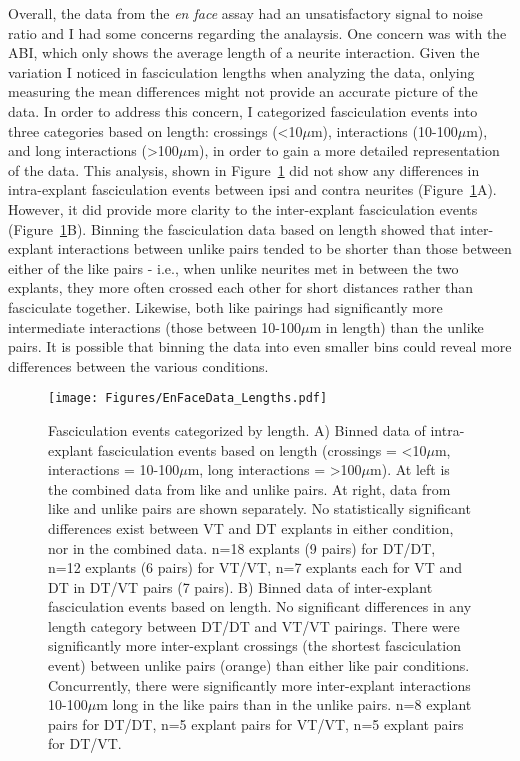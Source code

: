 Overall, the data from the \emph{en face} assay had an unsatisfactory signal to noise ratio and I had some concerns regarding the analaysis.
One concern was with the ABI, which only shows the average length of a neurite interaction.
Given the variation I noticed in fasciculation lengths when analyzing the data, onlying measuring the mean differences might not provide an accurate picture of the data.
In order to address this concern, I categorized fasciculation events into three categories based on length: crossings (<10$\mu$m), interactions (10-100$\mu$m), and long interactions (>100$\mu$m), in order to gain a more detailed representation of the data.
This analysis, shown in Figure~\ref{Figures/EnFaceDataLengths} did not show any differences in intra-explant fasciculation events between ipsi and contra neurites (Figure~\ref{Figures/EnFaceDataLengths}A).
However, it did provide more clarity to the inter-explant fasciculation events (Figure~\ref{Figures/EnFaceDataLengths}B).
Binning the fasciculation data based on length showed that inter-explant interactions between unlike pairs tended to be shorter than those between either of the like pairs - i.e., when unlike neurites met in between the two explants, they more often crossed each other for short distances rather than fasciculate together.
Likewise, both like pairings had significantly more intermediate interactions (those between 10-100$\mu$m in length) than the unlike pairs.
It is possible that binning the data into even smaller bins could reveal more differences between the various conditions.
\begin{figure}[hbtp]
    \begin{center}
        \texttt{[image: Figures/EnFaceData\_Lengths.pdf]}
        \caption[Fasciculation events categorized by length.]
        {Fasciculation events categorized by length.
        A) Binned data of intra-explant fasciculation events based on length (crossings = <10$\mu$m, interactions = 10-100$\mu$m, long interactions = >100$\mu$m).
        At left is the combined data from like and unlike pairs.
        At right, data from like and unlike pairs are shown separately.
        No statistically significant differences exist between VT and DT explants in either condition, nor in the combined data.
        n=18 explants (9 pairs) for DT/DT, n=12 explants (6 pairs) for VT/VT, n=7 explants each for VT and DT in DT/VT pairs (7 pairs).
        B) Binned data of inter-explant fasciculation events based on length.
        No significant differences in any length category between DT/DT and VT/VT pairings.
        There were significantly more inter-explant crossings (the shortest fasciculation event) between unlike pairs (orange) than either like pair conditions.
        Concurrently, there were significantly more inter-explant interactions 10-100$\mu$m long in the like pairs than in the unlike pairs.
        n=8 explant pairs for DT/DT, n=5 explant pairs for VT/VT, n=5 explant pairs for DT/VT.
        }
        \label{Figures/EnFaceDataLengths}
    \end{center}
\end{figure}

